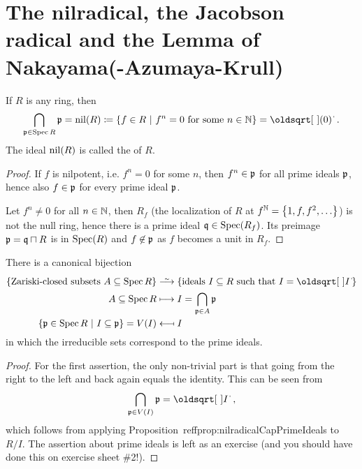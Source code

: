 \documentclass[a4paper,parskip=half,numbers=enddot, DIV=12]{scrreprt}
\begin{document}
\section{The nilradical, the Jacobson radical and the Lemma of Nakayama(-Azumaya-Krull)}

\begin{prop}
    If $R$ is any ring, then 
    \begin{align*}
    	\bigcap_{\substack{\pp\in\Spec R\\}} \pp =\nil(R) \coloneqq \left\{f\in R\st f^n=0 \text{ for some } n\in\IN\right\} = \sqrt{(0)}\;.
    \end{align*}
    The ideal $\operatorname{nil}(R)$ is called the  of $R$.
\end{prop}
\begin{proof}
    If $f$ is nilpotent, i.e. $f^n=0$ for some $n$, then $f^n\in\mathfrak{p}$ for all prime ideals $\mathfrak{p}$, hence also $f\in\mathfrak{p}$ for every prime ideal $\mathfrak{p}$. 
    
    Let $f^n\neq 0$ for all $n\in \mathbb{N}$, then $R_f$ (the localization of $R$ at $f^{\mathbb{N}}=\left\{1,f,f^2,\ldots\right\}$) is not the null ring, hence there is a prime ideal $\mathfrak{q}\in\operatorname{Spec}(R_f)$. Its preimage $\mathfrak{p}=\mathfrak{q}\sqcap R$ is in $\operatorname{Spec}(R)$ and $f\not \in\mathfrak{p}$ as $f$ becomes a unit in $R_f$.
\end{proof}
\begin{cor}
    There is a canonical bijection 
    \begin{align*}
	    \left\{\text{Zariski-closed subsets }A\subseteq \Spec R\right\}&\isomorphism \left\{\text{ideals }I\subseteq R\text{ such that }I=\sqrt{I}\right\}\\
        A \subseteq \Spec R &\longmapsto I = \bigcap_{\pp\in A} \pp\\
        \left\{\pp\in \Spec R\st I\subseteq \pp\right\}=V(I)&\longmapsfrom I
    \end{align*}
    in which the irreducible sets correspond to the prime ideals.
\end{cor}
\begin{proof}
    For the first assertion, the only non-trivial part is that going from the right to the left and back again equals the identity. This can be seen from 
    \begin{align}\lbl{eq:PrimeCapRadical}
        \bigcap_{\pp\in V(I)}\pp = \sqrt{I}\;,
    \end{align}
    which follows from applying Proposition~reff{prop:nilradicalCapPrimeIdeals} to $R/I$. The assertion about prime ideals is left as an exercise (and you should have done this on exercise sheet \#2!).
\end{proof}
\end{document}
